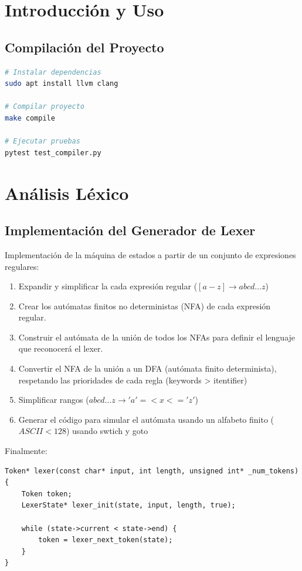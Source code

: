 \documentclass[11pt]{article}
\begin{document}
\section{Introducción y Uso}
\subsection{Compilación del Proyecto}
\begin{lstlisting}[language=bash]
# Instalar dependencias
sudo apt install llvm clang

# Compilar proyecto
make compile

# Ejecutar pruebas
pytest test_compiler.py
\end{lstlisting}

\section{Análisis Léxico}
\subsection{Implementación del Generador de Lexer}
Implementación de la máquina de estados a partir de un conjunto de expresiones regulares:

\begin{enumerate}
    \item Expandir y simplificar la cada expresión regular ($[a-z] \rightarrow abcd...z$)
    \item Crear los autómatas finitos no deterministas (NFA) de cada expresión regular.
    \item Construir el autómata de la unión de todos los NFAs para definir el lenguaje que reconocerá el lexer.
    \item Convertir el NFA de la unión a un DFA (autómata finito determinista), respetando las prioridades de cada regla (keywords > itentifier)
    \item Simplificar rangos ($abcd...z \rightarrow 'a' =< x <= 'z'$)
    \item Generar el código para simular el autómata usando un alfabeto finito ($ASCII < 128$) usando swtich y goto
\end{enumerate}


Finalmente:

\begin{lstlisting}
Token* lexer(const char* input, int length, unsigned int* _num_tokens) {
    Token token;
    LexerState* lexer_init(state, input, length, true);

    while (state->current < state->end) {
        token = lexer_next_token(state);
    }
}
\end{lstlisting}
\end{document}
